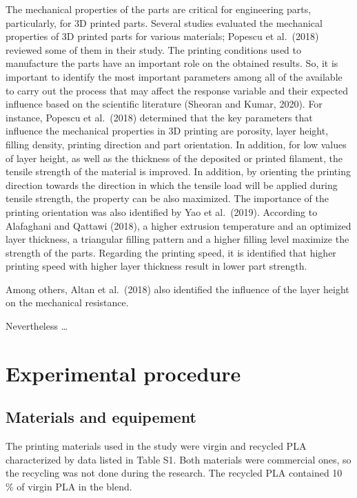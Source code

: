 \documentclass[]{elsarticle} %
\begin{document}
The mechanical properties of the parts are critical for engineering
parts, particularly, for 3D printed parts. Several studies evaluated the
mechanical properties of 3D printed parts for various materials; Popescu
et al.~(2018) reviewed some of them in their study. The printing
conditions used to manufacture the parts have an important role on the
obtained results. So, it is important to identify the most important
parameters among all of the available to carry out the process that may
affect the response variable and their expected influence based on the
scientific literature (Sheoran and Kumar, 2020). For instance, Popescu
et al.~(2018) determined that the key parameters that influence the
mechanical properties in 3D printing are porosity, layer height, filling
density, printing direction and part orientation. In addition, for low
values of layer height, as well as the thickness of the deposited or
printed filament, the tensile strength of the material is improved. In
addition, by orienting the printing direction towards the direction in
which the tensile load will be applied during tensile strength, the
property can be also maximized. The importance of the printing
orientation was also identified by Yao et al.~(2019). According to
Alafaghani and Qattawi (2018), a higher extrusion temperature and an
optimized layer thickness, a triangular filling pattern and a higher
filling level maximize the strength of the parts. Regarding the printing
speed, it is identified that higher printing speed with higher layer
thickness result in lower part strength.

Among others, Altan et al.~(2018) also identified the influence of the
layer height on the mechanical resistance.

Nevertheless \ldots{}

\hypertarget{experimental-procedure}{%
\section{Experimental procedure}\label{experimental-procedure}}

\hypertarget{materials-and-equipement}{%
\subsection{Materials and equipement}\label{materials-and-equipement}}

The printing materials used in the study were virgin and recycled PLA
characterized by data listed in Table S1. Both materials were commercial
ones, so the recycling was not done during the research. The recycled
PLA contained 10 \% of virgin PLA in the blend.
\end{document}

